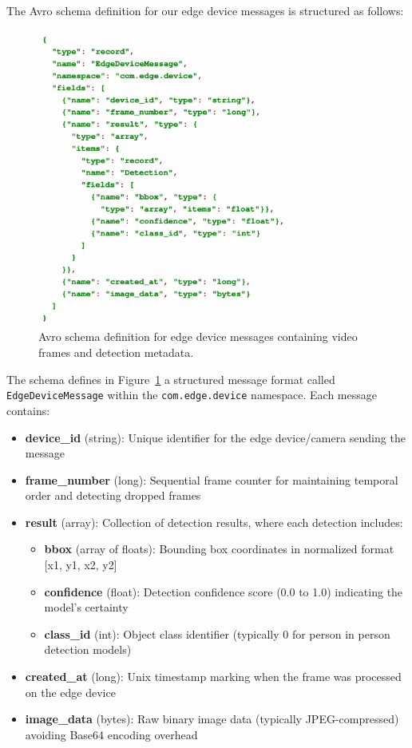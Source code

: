 The Avro schema definition for our edge device messages is structured as follows:

\newpage

\begin{figure}[htbp]
    \centering
    \includegraphics[width=0.8\textwidth]{Figure/avro_def.png}
    \caption{Avro schema definition for edge device messages containing video frames and detection metadata.}
    \label{fig:avro_schema}
\end{figure}

The schema defines in Figure~\ref{fig:avro_schema} a structured message format called \\
\texttt{EdgeDeviceMessage} within the \texttt{com.edge.device} namespace. Each message contains:

\begin{itemize}
    \item \textbf{device\_id} (string): Unique identifier for the edge device/camera sending the message
    \item \textbf{frame\_number} (long): Sequential frame counter for maintaining temporal order and detecting dropped frames
    \item \textbf{result} (array): Collection of detection results, where each detection includes:
    \begin{itemize}
        \item \textbf{bbox} (array of floats): Bounding box coordinates in normalized format [x1, y1, x2, y2]
        \item \textbf{confidence} (float): Detection confidence score (0.0 to 1.0) indicating the model's certainty
        \item \textbf{class\_id} (int): Object class identifier (typically 0 for person in person detection models)
    \end{itemize}
    \item \textbf{created\_at} (long): Unix timestamp marking when the frame was processed on the edge device
    \item \textbf{image\_data} (bytes): Raw binary image data (typically JPEG-compressed) avoiding Base64 encoding overhead
\end{itemize}

